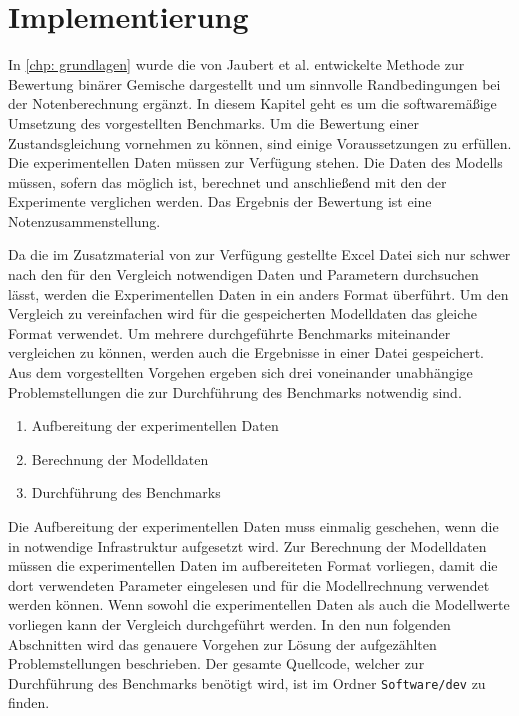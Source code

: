 \documentclass[../thesis.tex]{subfiles}
\begin{document}
\chapter{Implementierung}
\label{chp: implementierung}
In \autoref{chp: grundlagen} wurde die von Jaubert et al. entwickelte Methode zur Bewertung binärer Gemische dargestellt und um sinnvolle Randbedingungen bei der Notenberechnung ergänzt. In diesem Kapitel geht es um die softwaremäßige Umsetzung des vorgestellten Benchmarks.
Um die Bewertung einer Zustandsgleichung vornehmen zu können, sind einige Voraussetzungen zu erfüllen. Die experimentellen Daten müssen zur Verfügung stehen. Die Daten des Modells müssen, sofern das möglich ist, berechnet und anschließend mit den der Experimente verglichen werden. Das Ergebnis der Bewertung ist eine Notenzusammenstellung.

Da die im Zusatzmaterial von \cite{jaubert2020benchmark} zur Verfügung gestellte Excel Datei sich nur schwer nach den für den Vergleich notwendigen Daten und Parametern durchsuchen lässt, werden die Experimentellen Daten in ein anders Format überführt. Um den Vergleich zu vereinfachen wird für die gespeicherten Modelldaten das gleiche Format verwendet. Um mehrere durchgeführte Benchmarks miteinander vergleichen zu können, werden auch die Ergebnisse in einer Datei gespeichert. Aus dem vorgestellten Vorgehen ergeben sich drei voneinander unabhängige Problemstellungen die zur Durchführung des Benchmarks notwendig sind.

\begin{enumerate}
	\item Aufbereitung der experimentellen Daten
	\item Berechnung der Modelldaten
	\item Durchführung des Benchmarks
\end{enumerate}

Die Aufbereitung der experimentellen Daten muss einmalig geschehen, wenn die in notwendige Infrastruktur aufgesetzt wird. Zur Berechnung der Modelldaten müssen die experimentellen Daten im aufbereiteten Format vorliegen, damit die dort verwendeten Parameter eingelesen und für die Modellrechnung verwendet werden können. Wenn sowohl die experimentellen Daten als auch die Modellwerte vorliegen kann der Vergleich durchgeführt werden. In den nun folgenden Abschnitten wird das genauere Vorgehen zur Lösung der aufgezählten Problemstellungen beschrieben. Der gesamte Quellcode, welcher zur Durchführung des Benchmarks benötigt wird, ist im Ordner \texttt{Software/dev} zu finden. 
\end{document}
